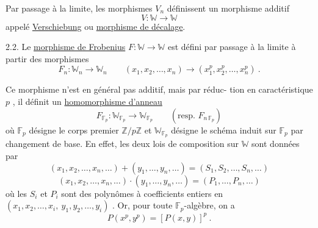 Par passage à la limite, les morphismes $V_n$ définissent un
morphisme additif
\[ V : \mathbb{W} \to \mathbb{W} \]
appelé \uline{Verschiebung} ou \uline{morphisme de décalage}.

2.2. \qquad Le \uline{morphisme de Frobenius} $F : \mathbb{W} \to \mathbb{W}$ est défini par passage
à la limite à partir des morphismes
\[ F_n : \mathbb{W}_n \to \mathbb{W}_n \qquad (x_1,x_2,\ldots,x_n) \to (x_1^p,x_2^p,\ldots,x_n^p) \ . \]

Ce morphisme n'est en général pas additif, mais par réduc-%
tion en caractéristique $p$ , il définit un \uline{homomorphisme d'anneau}
\[ F_{\mathbb{F}_p} : \mathbb{W}_{\mathbb{F}_p} \to \mathbb{W}_{\mathbb{F}_p} \qquad (\text{resp. } F_{n\,\mathbb{F}_p}) \]
où $\mathbb{F}_p$ désigne le corps premier $\mathbb{Z}/p\mathbb{Z}$ et $\mathbb{W}_{\mathbb{F}_p}$ désigne le schéma induit
sur $\mathbb{F}_p$ par changement de base. En effet, les deux lois de composition
sur $\mathbb{W}$ sont données par
\[ (x_1,x_2,\ldots,x_n,\ldots) + (y_1,\ldots,y_n,\ldots) = (S_1,S_2,\ldots,S_n,\ldots) \]
\[ (x_1,x_2,\ldots,x_n,\ldots) \cdot (y_1,\ldots,y_n,\ldots) = (P_1,\ldots,P_n,\ldots) \]
où les $S_i$ et $P_i$ sont des polynômes à coefficients entiers en
$(x_1,x_2,\ldots,x_i,\ y_1,y_2,\ldots,y_i)$ . Or, pour toute $\mathbb{F}_p$-algèbre, on a
\[ P(x^p,y^p) = [P(x,y)]^p \ . \]

